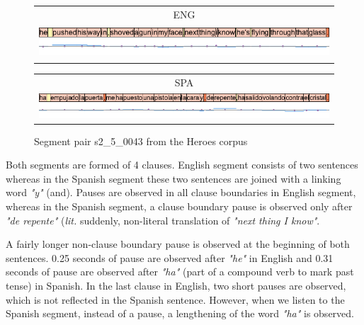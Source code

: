 \begin{figure}[h!]
\begin{minipage}{\textwidth}
\begin{tabular}{c}
ENG \\
\includegraphics[height=1.2cm, width=\textwidth]{img/s2_5_0043-EN.png} \\
\end{tabular}
\end{minipage}
\begin{minipage}{\textwidth}
\begin{tabular}{c}
SPA \\
\includegraphics[width=\textwidth]{img/s2_5_0043-ES.png} \\
\end{tabular}
\end{minipage}
\caption{Segment pair s2\_5\_0043 from the Heroes corpus}
\label{figure:heroes_viz_1}
\end{figure}

Both segments are formed of 4 clauses. English segment consists of two sentences whereas in the Spanish segment these two sentences are joined with a linking word \textit{"y"} (and). Pauses are observed in all clause boundaries in English segment, whereas in the Spanish segment, a clause boundary pause is observed only after \textit{"de repente"} (\textit{lit.} suddenly, non-literal translation of \textit{"next thing I know"}. 

A fairly longer non-clause boundary pause is observed at the beginning of both sentences. 0.25 seconds of pause are observed after \textit{"he"} in English and 0.31 seconds of pause are observed after \textit{"ha"} (part of a compound verb to mark past tense) in Spanish. In the last clause in English, two short pauses are observed, which is not reflected in the Spanish sentence. However, when we listen to the Spanish segment, instead of a pause, a lengthening of the word \textit{"ha"} is observed. 

